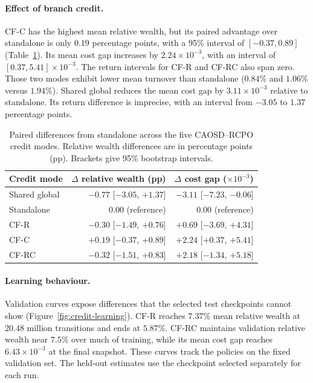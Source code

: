 \documentclass[10pt]{article}
\begin{document}
\paragraph{Effect of branch credit.}
CF-C has the highest mean relative wealth, but its paired advantage over standalone is only $0.19$ percentage points, with a 95\% interval of $[-0.37,0.89]$ (Table~\ref{tab:matched-credit-results}). Its mean cost gap increases by $2.24\times10^{-3}$, with an interval of $[0.37,5.41]\times10^{-3}$. The return intervals for CF-R and CF-RC also span zero. Those two modes exhibit lower mean turnover than standalone ($0.84\%$ and $1.06\%$ versus $1.94\%$). Shared global reduces the mean cost gap by $3.11\times10^{-3}$ relative to standalone. Its return difference is imprecise, with an interval from $-3.05$ to $1.37$ percentage points.

\begin{table}[tbp]
\centering
\caption{Paired differences from standalone across the five CAOSD--RCPO credit modes. Relative wealth differences are in percentage points (pp). Brackets give 95\% bootstrap intervals.}
\label{tab:matched-credit-results}
\small
\begin{tabular}{@{}lrr@{}}
\toprule
Credit mode & $\Delta$ relative wealth (pp) & $\Delta$ cost gap ($\times 10^{-3}$) \\
\midrule
Shared global & $-0.77$ [$-3.05$, $+1.37$] & $-3.11$ [$-7.23$, $-0.06$] \\
Standalone    & $0.00$ (reference)          & $0.00$ (reference) \\
CF-R          & $-0.30$ [$-1.49$, $+0.76$] & $+0.69$ [$-3.69$, $+4.31$] \\
CF-C          & $+0.19$ [$-0.37$, $+0.89$] & $+2.24$ [$+0.37$, $+5.41$] \\
CF-RC         & $-0.32$ [$-1.51$, $+0.83$] & $+2.18$ [$-1.34$, $+5.18$] \\
\bottomrule
\end{tabular}
\end{table}

\paragraph{Learning behaviour.}
Validation curves expose differences that the selected test checkpoints cannot show (Figure~\ref{fig:credit-learning}). CF-R reaches $7.37\%$ mean relative wealth at 20.48 million transitions and ends at $5.87\%$. CF-RC maintains validation relative wealth near $7.5\%$ over much of training, while its mean cost gap reaches $6.43\times10^{-3}$ at the final snapshot. These curves track the policies on the fixed validation set. The held-out estimates use the checkpoint selected separately for each run.
\end{document}

